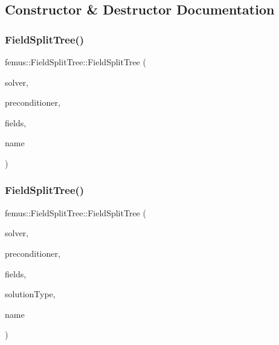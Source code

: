 \subsection{Constructor \& Destructor Documentation}
\mbox{\label{classfemus_1_1_field_split_tree_a37f4e60aca7cd9a089c1c3f383aab68e}} 
\subsubsection{\texorpdfstring{Field\+Split\+Tree()}{FieldSplitTree()}\hspace{0.1cm}{\footnotesize\ttfamily [1/3]}}
{\footnotesize\ttfamily femus\+::\+Field\+Split\+Tree\+::\+Field\+Split\+Tree (\begin{DoxyParamCaption}\item[{const \mbox{\hyperlink{_solvertype_enum_8hpp_a8b06041d7c1fb05f379714f4312306ec}{Solver\+Type}} \&}]{solver,  }\item[{const \mbox{\hyperlink{_precondtype_enum_8hpp_a8b341faac6531c4543c9dc6e5e4592cf}{Preconditioner\+Type}} \&}]{preconditioner,  }\item[{const std\+::vector$<$ unsigned $>$ \&}]{fields,  }\item[{std\+::string}]{name }\end{DoxyParamCaption})}

\mbox{\label{classfemus_1_1_field_split_tree_a05e2a386ed200db5d1461f2c328f7935}} 
\subsubsection{\texorpdfstring{Field\+Split\+Tree()}{FieldSplitTree()}\hspace{0.1cm}{\footnotesize\ttfamily [2/3]}}
{\footnotesize\ttfamily femus\+::\+Field\+Split\+Tree\+::\+Field\+Split\+Tree (\begin{DoxyParamCaption}\item[{const \mbox{\hyperlink{_solvertype_enum_8hpp_a8b06041d7c1fb05f379714f4312306ec}{Solver\+Type}} \&}]{solver,  }\item[{const \mbox{\hyperlink{_precondtype_enum_8hpp_a8b341faac6531c4543c9dc6e5e4592cf}{Preconditioner\+Type}} \&}]{preconditioner,  }\item[{const std\+::vector$<$ unsigned $>$ \&}]{fields,  }\item[{const std\+::vector$<$ unsigned $>$ \&}]{solution\+Type,  }\item[{std\+::string}]{name }\end{DoxyParamCaption})}

